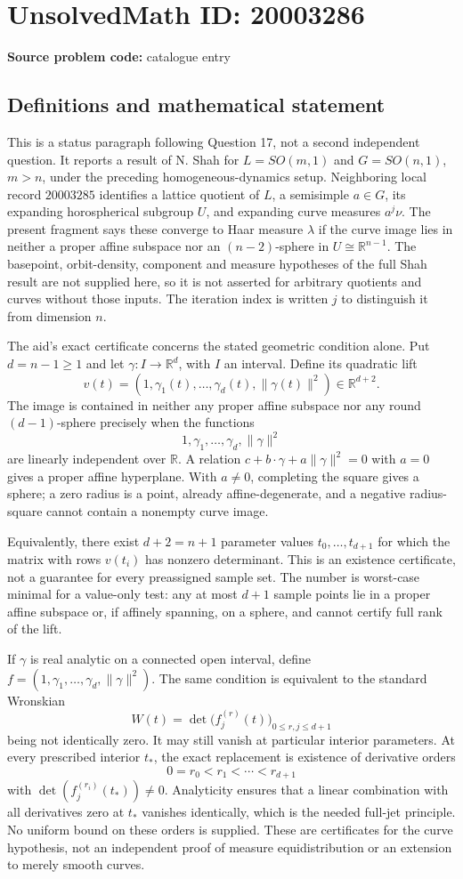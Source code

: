 \documentclass[11pt]{article}
\newcommand{\R}{\mathbb{R}}
\begin{document}
\section*{UnsolvedMath ID: 20003286}
\textbf{Source problem code:} catalogue entry
\subsection{Definitions and mathematical statement}
This is a status paragraph following Question 17, not a second independent question. It reports a result of N. Shah for $L=SO(m,1)$ and $G=SO(n,1)$, $m>n$, under the preceding homogeneous-dynamics setup. Neighboring local record $20003285$ identifies a lattice quotient of $L$, a semisimple $a\in G$, its expanding horospherical subgroup $U$, and expanding curve measures $a^j\nu$. The present fragment says these converge to Haar measure $\lambda$ if the curve image lies in neither a proper affine subspace nor an $(n-2)$-sphere in $U\cong\R^{n-1}$. The basepoint, orbit-density, component and measure hypotheses of the full Shah result are not supplied here, so it is not asserted for arbitrary quotients and curves without those inputs. The iteration index is written $j$ to distinguish it from dimension $n$.

The aid's exact certificate concerns the stated geometric condition alone. Put $d=n-1\geq1$ and let $\gamma:I\to\R^d$, with $I$ an interval. Define its quadratic lift
\[
 v(t)=(1,\gamma_1(t),\ldots,\gamma_d(t),\|\gamma(t)\|^2)
           \in\R^{d+2}.
\]
The image is contained in neither any proper affine subspace nor any round $(d-1)$-sphere precisely when the functions
\[
 1,\gamma_1,\ldots,\gamma_d,\|\gamma\|^2
\]
are linearly independent over $\R$. A relation $c+b\cdot\gamma+a\|\gamma\|^2=0$ with $a=0$ gives a proper affine hyperplane. With $a\ne0$, completing the square gives a sphere; a zero radius is a point, already affine-degenerate, and a negative radius-square cannot contain a nonempty curve image.

Equivalently, there exist $d+2=n+1$ parameter values $t_0,\ldots,t_{d+1}$ for which the matrix with rows $v(t_i)$ has nonzero determinant. This is an existence certificate, not a guarantee for every preassigned sample set. The number is worst-case minimal for a value-only test: any at most $d+1$ sample points lie in a proper affine subspace or, if affinely spanning, on a sphere, and cannot certify full rank of the lift.

If $\gamma$ is real analytic on a connected open interval, define $f=(1,\gamma_1,\ldots,\gamma_d,\|\gamma\|^2)$. The same condition is equivalent to the standard Wronskian
\[
 W(t)=\det\bigl(f_j^{(r)}(t)\bigr)_{0\leq r,j\leq d+1}
\]
being not identically zero. It may still vanish at particular interior parameters. At every prescribed interior $t_*$, the exact replacement is existence of derivative orders
\[
 0=r_0<r_1<\cdots<r_{d+1}
\]
with $\det(f_j^{(r_i)}(t_*))\ne0$. Analyticity ensures that a linear combination with all derivatives zero at $t_*$ vanishes identically, which is the needed full-jet principle. No uniform bound on these orders is supplied. These are certificates for the curve hypothesis, not an independent proof of measure equidistribution or an extension to merely smooth curves.
\end{document}
